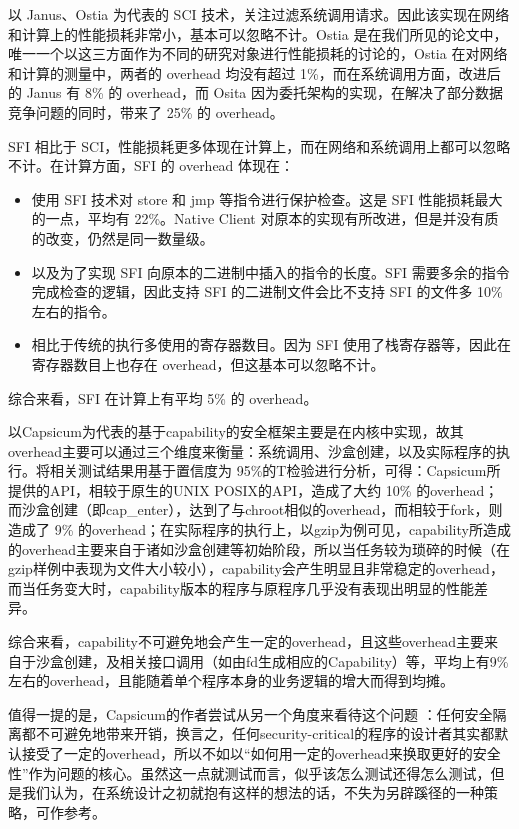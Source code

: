 \documentclass[final,5p,times]{elsarticle}
\begin{document}
以 Janus、Ostia 为代表的 SCI 技术，关注过滤系统调用请求。因此该实现在网络和计算上的性能损耗非常小，基本可以忽略不计。Ostia 是在我们所见的论文中，唯一一个以这三方面作为不同的研究对象进行性能损耗的讨论的，Ostia 在对网络和计算的测量中，两者的 overhead 均没有超过 1\%，而在系统调用方面，改进后的 Janus \cite{wagner1999janus} 有 8\% 的 overhead，而 Osita 因为委托架构的实现，在解决了部分数据竞争问题的同时，带来了 25\% 的 overhead。

SFI 相比于 SCI，性能损耗更多体现在计算上，而在网络和系统调用上都可以忽略不计。在计算方面，SFI 的 overhead 体现在：

\begin{itemize}
\item
使用 SFI 技术对 store 和 jmp 等指令进行保护检查。这是 SFI 性能损耗最大的一点，平均有 22\%。Native Client 对原本的实现有所改进，但是并没有质的改变，仍然是同一数量级。
\item
以及为了实现 SFI 向原本的二进制中插入的指令的长度。SFI 需要多余的指令完成检查的逻辑，因此支持 SFI 的二进制文件会比不支持 SFI 的文件多 10\% 左右的指令。
\item
相比于传统的执行多使用的寄存器数目。因为 SFI 使用了栈寄存器等，因此在寄存器数目上也存在 overhead，但这基本可以忽略不计。
\end{itemize}

综合来看，SFI 在计算上有平均 5\% 的 overhead。

以Capsicum为代表的基于capability的安全框架主要是在内核中实现，故其overhead主要可以通过三个维度来衡量：系统调用、沙盒创建，以及实际程序的执行。将相关测试结果用基于置信度为 95\%的T检验进行分析，可得：Capsicum所提供的API，相较于原生的UNIX POSIX的API，造成了大约 10\% 的overhead；而沙盒创建（即cap\_enter），达到了与chroot相似的overhead，而相较于fork，则造成了 9\% 的overhead；在实际程序的执行上，以gzip为例可见，capability所造成的overhead主要来自于诸如沙盒创建等初始阶段，所以当任务较为琐碎的时候（在gzip样例中表现为文件大小较小），capability会产生明显且非常稳定的overhead，而当任务变大时，capability版本的程序与原程序几乎没有表现出明显的性能差异。

综合来看，capability不可避免地会产生一定的overhead，且这些overhead主要来自于沙盒创建，及相关接口调用（如由fd生成相应的Capability）等，平均上有9\%左右的overhead，且能随着单个程序本身的业务逻辑的增大而得到均摊。

值得一提的是，Capsicum的作者尝试从另一个角度来看待这个问题 \cite{capsicum}：任何安全隔离都不可避免地带来开销，换言之，任何security-critical的程序的设计者其实都默认接受了一定的overhead，所以不如以“如何用一定的overhead来换取更好的安全性”作为问题的核心。虽然这一点就测试而言，似乎该怎么测试还得怎么测试，但是我们认为，在系统设计之初就抱有这样的想法的话，不失为另辟蹊径的一种策略，可作参考。
\end{document}
